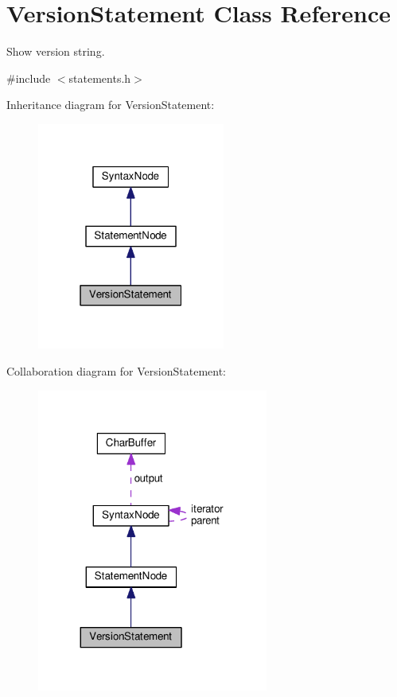 \hypertarget{classVersionStatement}{}\section{Version\+Statement Class Reference}
\label{classVersionStatement}


Show version string.  




{\ttfamily \#include $<$statements.\+h$>$}



Inheritance diagram for Version\+Statement\+:\nopagebreak
\begin{figure}[H]
\begin{center}
\leavevmode
\includegraphics[width=175pt]{classVersionStatement__inherit__graph}
\end{center}
\end{figure}


Collaboration diagram for Version\+Statement\+:\nopagebreak
\begin{figure}[H]
\begin{center}
\leavevmode
\includegraphics[width=215pt]{classVersionStatement__coll__graph}
\end{center}
\end{figure}

